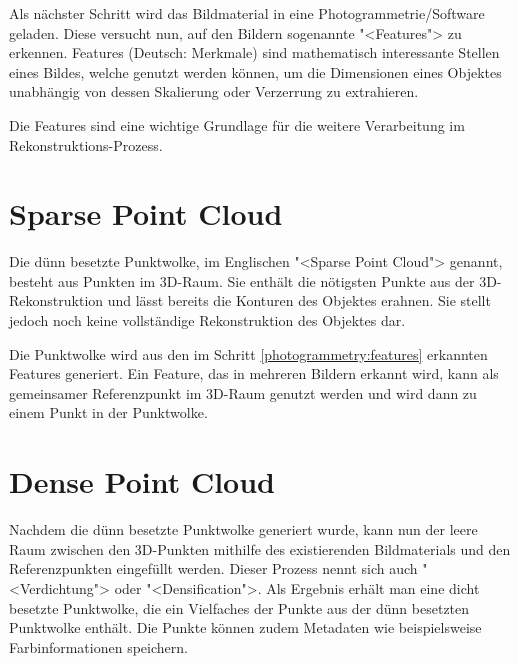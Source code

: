 Als nächster Schritt wird das Bildmaterial in eine Photogrammetrie\-/Software
geladen. Diese versucht nun, auf den Bildern sogenannte "<Features"> zu
erkennen. Features (Deutsch: Merkmale) sind mathematisch interessante Stellen
eines Bildes, welche genutzt werden können, um die Dimensionen eines Objektes
unabhängig von dessen Skalierung oder Verzerrung zu extrahieren.

Die Features sind eine wichtige Grundlage für die weitere Verarbeitung im
Rekonstruktions-Prozess.


\section{Sparse Point Cloud}

\label{photogrammetry:sparse-point-cloud}

Die dünn besetzte Punktwolke, im Englischen "<Sparse Point Cloud"> genannt,
besteht aus Punkten im 3D-Raum. Sie enthält die nötigsten Punkte aus der
3D-Rekonstruktion und lässt bereits die Konturen des Objektes erahnen. Sie
stellt jedoch noch keine vollständige Rekonstruktion des Objektes dar.

Die Punktwolke wird aus den im Schritt \ref{photogrammetry:features} erkannten
Features generiert. Ein Feature, das in mehreren Bildern erkannt wird, kann als
gemeinsamer Referenzpunkt im 3D-Raum genutzt werden und wird dann zu einem Punkt
in der Punktwolke.


\section{Dense Point Cloud}

\label{photogrammetry:dense-point-cloud}

Nachdem die dünn besetzte Punktwolke generiert wurde, kann nun der leere Raum
zwischen den 3D-Punkten mithilfe des existierenden Bildmaterials und den
Referenzpunkten eingefüllt werden. Dieser Prozess nennt sich auch
"<Verdichtung"> oder "<Densification">. Als Ergebnis erhält man eine dicht
besetzte Punktwolke, die ein Vielfaches der Punkte aus der dünn besetzten
Punktwolke enthält. Die Punkte können zudem Metadaten wie beispielsweise
Farbinformationen speichern.


